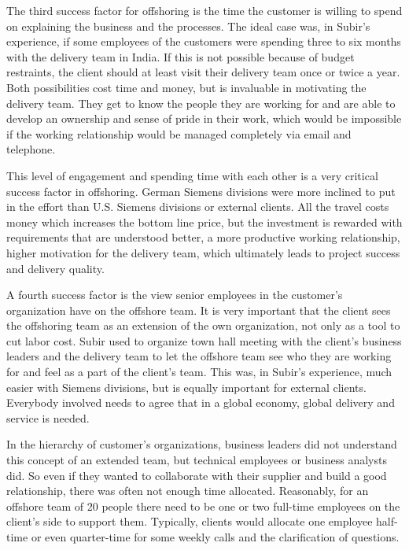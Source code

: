 The third success factor for offshoring is the time the customer is willing to spend on explaining the business and the processes. The ideal case was, in Subir's experience, if some employees of the customers were spending three to six months with the delivery team in India. If this is not possible because of budget restraints, the client should at least visit their delivery team once or twice a year. Both possibilities cost time and money, but is invaluable in motivating the delivery team. They get to know the people they are working for and are able to develop an ownership and sense of pride in their work, which would be impossible if the working relationship would be managed completely via email and telephone.

This level of engagement and spending time with each other is a very critical success factor in offshoring. German Siemens divisions were more inclined to put in the effort than U.S. Siemens divisions or external clients. All the travel costs money which increases the bottom line price, but the investment is rewarded with requirements that are understood better, a more productive working relationship, higher motivation for the delivery team, which ultimately leads to project success and delivery quality.

A fourth success factor is the view senior employees in the customer's organization have on the offshore team. It is very important that the client sees the offshoring team as an extension of the own organization, not only as a tool to cut labor cost. Subir used to organize town hall meeting with the client's business leaders and the delivery team to let the offshore team see who they are working for and feel as a part of the client's team. This was, in Subir's experience, much easier with Siemens divisions, but is equally important for external clients. Everybody involved needs to agree that in a global economy, global delivery and service is needed.

In the hierarchy of customer's organizations, business leaders did not understand this concept of an extended team, but technical employees or business analysts did. So even if they wanted to collaborate with their supplier and build a good relationship, there was often not enough time allocated. Reasonably, for an offshore team of 20 people there need to be one or two full-time employees on the client's side to support them. Typically, clients would allocate one employee half-time or even quarter-time for some weekly calls and the clarification of questions.

